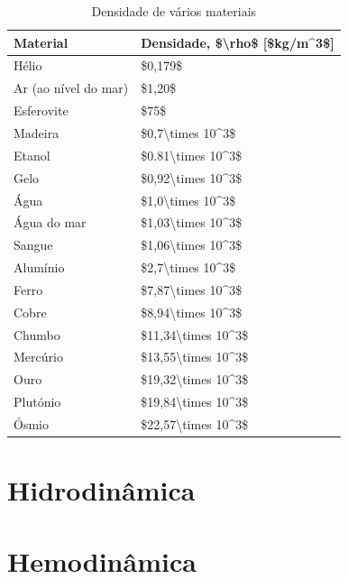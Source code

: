 \documentclass[
  portuguese,
  ]{book}
\begin{document}
\begin{table}

\caption{\label{tab:unnamed-chunk-4}Densidade de vários materiais}
\centering
\begin{tabular}[t]{l|l}
\hline
Material & Densidade, \$\textbackslash{}rho\$ [\$kg/m\textasciicircum{}3\$]\\
\hline
Hélio & \$0,179\$\\
\hline
Ar (ao nível do mar) & \$1,20\$\\
\hline
Esferovite & \$75\$\\
\hline
Madeira & \$0,7\textbackslash{}times 10\textasciicircum{}3\$\\
\hline
Etanol & \$0.81\textbackslash{}times 10\textasciicircum{}3\$\\
\hline
Gelo & \$0,92\textbackslash{}times 10\textasciicircum{}3\$\\
\hline
Água & \$1,0\textbackslash{}times 10\textasciicircum{}3\$\\
\hline
Água do mar & \$1,03\textbackslash{}times 10\textasciicircum{}3\$\\
\hline
Sangue & \$1,06\textbackslash{}times 10\textasciicircum{}3\$\\
\hline
Alumínio & \$2,7\textbackslash{}times 10\textasciicircum{}3\$\\
\hline
Ferro & \$7,87\textbackslash{}times 10\textasciicircum{}3\$\\
\hline
Cobre & \$8,94\textbackslash{}times 10\textasciicircum{}3\$\\
\hline
Chumbo & \$11,34\textbackslash{}times 10\textasciicircum{}3\$\\
\hline
Mercúrio & \$13,55\textbackslash{}times 10\textasciicircum{}3\$\\
\hline
Ouro & \$19,32\textbackslash{}times 10\textasciicircum{}3\$\\
\hline
Plutónio & \$19,84\textbackslash{}times 10\textasciicircum{}3\$\\
\hline
Ósmio & \$22,57\textbackslash{}times 10\textasciicircum{}3\$\\
\hline
\end{tabular}
\end{table}

\hypertarget{hidrodinuxe2mica}{%
\chapter{Hidrodinâmica}\label{hidrodinuxe2mica}}

\hypertarget{hemodinuxe2mica}{%
\chapter{Hemodinâmica}\label{hemodinuxe2mica}}
\end{document}
